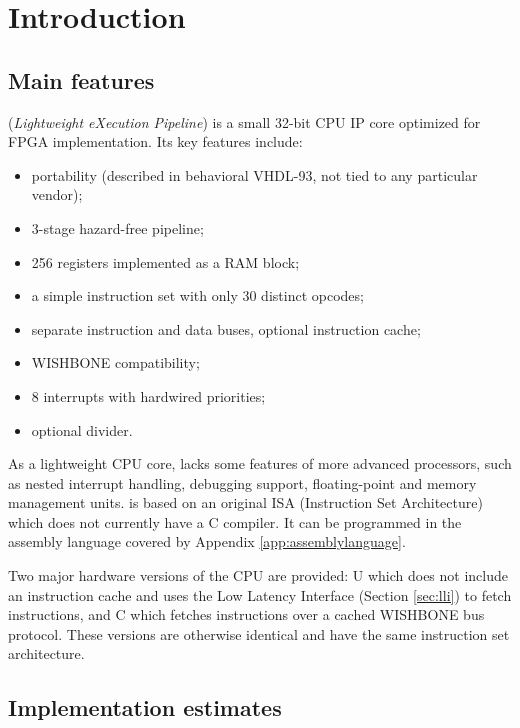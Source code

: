 \documentclass[a4paper,12pt,twoside,extrafontsizes]{memoir}
\begin{document}


\mainmatter

\chapter{Introduction}

\section{Main features}

\lxp{} (\emph{Lightweight eXecution Pipeline}) is a small 32-bit CPU IP core optimized for FPGA implementation. Its key features include:

\begin{itemize}
	\item portability (described in behavioral VHDL-93, not tied to any particular vendor);
	\item 3-stage hazard-free pipeline;
	\item 256 registers implemented as a RAM block;
	\item a simple instruction set with only 30 distinct opcodes;
	\item separate instruction and data buses, optional instruction cache;
	\item WISHBONE compatibility;
	\item 8 interrupts with hardwired priorities;
	\item optional divider.
\end{itemize}

As a lightweight CPU core, \lxp{} lacks some features of more advanced processors, such as nested interrupt handling, debugging support, floating-point and memory management units. \lxp{} is based on an original ISA (Instruction Set Architecture) which does not currently have a C compiler. It can be programmed in the assembly language covered by Appendix \ref{app:assemblylanguage}.

Two major hardware versions of the CPU are provided: \lxp{}U which does not include an instruction cache and uses the Low Latency Interface (Section \ref{sec:lli}) to fetch instructions, and \lxp{}C which fetches instructions over a cached WISHBONE bus protocol. These versions are otherwise identical and have the same instruction set architecture.

\section{Implementation estimates}
\end{document}
